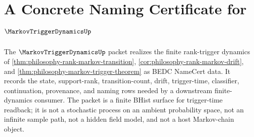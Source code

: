 \chapter{A Concrete Naming Certificate for $\MarkovTriggerDynamicsUp$}
\label{ch:concrete-instances-markov-trigger-dynamics-namecert}

The $\MarkovTriggerDynamicsUp$ packet realizes the finite rank-trigger dynamics of \autoref{thm:philosophy-rank-markov-transition}, \autoref{cor:philosophy-rank-markov-drift}, and \autoref{thm:philosophy-markov-trigger-theorem} as BEDC NameCert data. It records the state, support-rank, transition-count, drift, trigger-time, classifier, continuation, provenance, and naming rows needed by a downstream finite-dynamics consumer. The packet is a finite BHist surface for trigger-time readback; it is not a stochastic process on an ambient probability space, not an infinite sample path, not a hidden field model, and not a host Markov-chain object.

